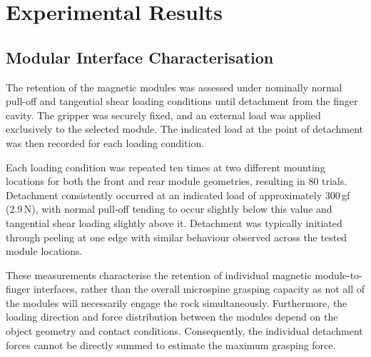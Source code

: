 \documentclass[letterpaper, 10 pt, conference, twoside]{ieeetran}
\begin{document}


\section{Experimental Results}

\subsection{Modular Interface Characterisation}

The retention of the magnetic modules was assessed
under nominally normal pull-off and tangential shear loading conditions until detachment from the finger cavity. The gripper was securely fixed, and an external load was applied exclusively to the selected module. The indicated load at the point of detachment was then recorded for each loading condition.

Each loading condition was repeated ten times at two different mounting locations for both the front and rear module geometries, resulting in 80 trials. Detachment consistently occurred at an indicated load of approximately 300\,gf (2.9\,N), with normal pull-off tending to occur slightly below this value and tangential shear loading slightly above it. Detachment was typically initiated through peeling at one edge with similar behaviour observed across the tested module locations.

These measurements characterise the retention of individual magnetic module-to-finger interfaces,
rather than the overall microspine grasping capacity as not all of the modules will necessarily engage the rock simultaneously. Furthermore, the loading direction and force distribution between the modules depend on the object geometry and contact conditions. Consequently, the individual detachment forces cannot be directly summed to estimate the maximum grasping force.
\end{document}
